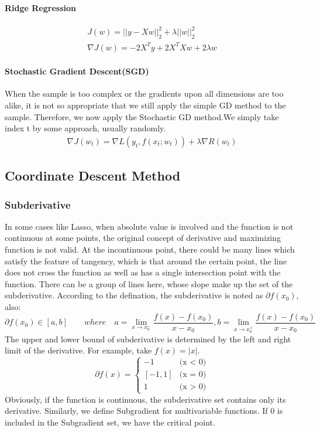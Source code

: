 \documentclass{article}
\begin{document}
	\paragraph{Ridge Regression}
	\begin{gather*}
		J(w) = ||y - Xw||^2_2 + \lambda ||w||^2_2\\
		\nabla J(w) = -2X^Ty + 2X^TXw + 2\lambda w
	\end{gather*}
	\paragraph{Stochastic Gradient Descent(SGD)}
	When the sample is too complex or the gradients upon all dimensions are too alike, it is not so appropriate that we still apply the simple GD method to the sample. Therefore, we now apply the Stochastic GD method.We simply take index t by some approach, usually randomly.
	\begin{gather*}
		\nabla J(w_t) = \nabla L(y_t, f(x_t;w_t)) + \lambda \nabla R(w_t)
	\end{gather*}
\subsection{Coordinate Descent Method}
	\subsubsection{Subderivative}
	In some cases like Lasso, when absolute value is involved and the function is not continuous at some points, the original concept of derivative and maximizing function is not valid. At the incontinuous point, there could be many lines which satisfy the feature of tangency, which is that around the certain point, the line does not cross the function as well as has a single intersection point with the function. There can be a group of lines here, whose slope make up the set of the subderivative. According to the defination, the subderivative is noted as $\partial f(x_0)$, also:
	\begin{displaymath}
		\partial f(x_0) \in
		[a,b]\qquad where\quad
		a = \lim_{x \rightarrow x_0^-} \frac{f(x)-f(x_0)}{x-x_0},
		b = \lim_{x \rightarrow x_0^+} \frac{f(x)-f(x_0)}{x-x_0}
	\end{displaymath}
	The upper and lower bound of subderivative is determined by the left and right limit of the derivative. For example, take $f(x) = |x|$.
	\begin{displaymath}
		\partial f(x) = \left\{\begin{array}{ll}
			-1 & \textrm{(x < 0)}\\
			\left[-1,1\right] & \textrm{(x = 0)}\\
			1 & \textrm{(x > 0)}
			\end{array} \right.
	\end{displaymath}
	Obviously, if the function is continuous, the subderivative set contains only its derivative. Similarly, we define Subgradient for multivariable functions. If 0 is included in the Subgradient set, we have the critical point.
\end{document}
